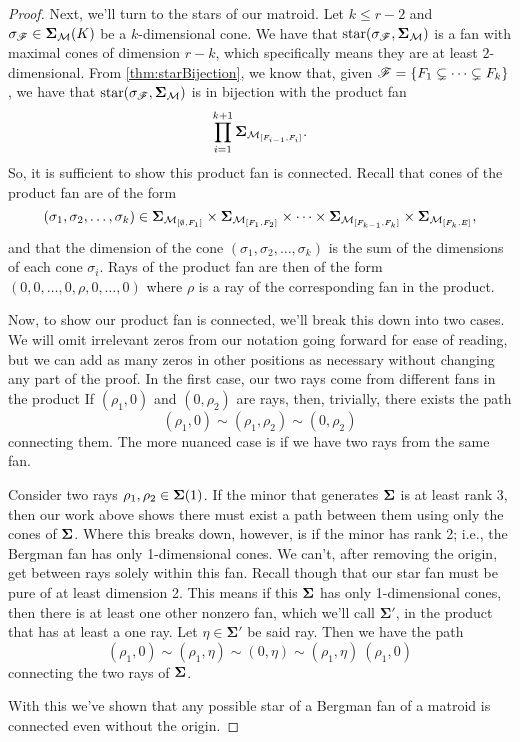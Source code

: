 \documentclass[12pt,oneside]{../../sfsuthesis}
\begin{document}
\begin{proof}
    Next, we'll turn to the stars of our matroid.
    Let \( k \leq r - 2 \) and \( \sigma_{\mathscr{F}} \in \bm{\Sigma}_{\mathcal{M}}(K) \) be a \( k \)-dimensional cone.
    We have that \( \operatorname{star}( \sigma_{\mathscr{F}}, \bm{\Sigma}_{\mathcal{M}}) \) is a fan with maximal cones of dimension \( r - k \), which specifically means they are at least \( 2 \)-dimensional.
    From \th\ref{thm:starBijection}, we know that, given \( \mathscr{F} = \{ F_1 \subsetneq \cdots \subsetneq F_k \} \), we have that \( \operatorname{star}( \sigma_{\mathscr{F}}, \bm{\Sigma}_{\mathcal{M}}) \) is in bijection with the product fan
    \[
        \prod_{i = 1}^{k+1} \bm{\Sigma}_{\mathcal{M}_{[F_{i-1}, F_i]}}.
    \]
    So, it is sufficient to show this product fan is connected.
    Recall that cones of the product fan are of the form
    \[
        (\sigma_1, \sigma_2, \dots, \sigma_k) \in \bm{\Sigma}_{\mathcal{M}_{[\emptyset, F_1]}} \times \bm{\Sigma}_{\mathcal{M}_{[F_{1}, F_2]}} \times \cdots \times \bm{\Sigma}_{\mathcal{M}_{[F_{k-1}, F_k]}} \times \bm{\Sigma}_{\mathcal{M}_{[F_{k}, E]}},
    \]
    and that the dimension of the cone \( (\sigma_1, \sigma_2, \dots, \sigma_k) \) is the sum of the dimensions of each cone \( \sigma_i \).
    Rays of the product fan are then of the form \( (0, 0, \dots, 0,  \rho, 0, \dots, 0) \) where \( \rho \) is a ray of the corresponding fan in the product.

    Now, to show our product fan is connected, we'll break this down into two cases.
    We will omit irrelevant zeros from our notation going forward for ease of reading, but we can add as many zeros in other positions as necessary without changing any part of the proof.
    In the first case, our two rays come from different fans in the product
    If \( (\rho_1, 0) \) and \( (0, \rho_2) \) are rays, then, trivially, there exists the path
    \[
        (\rho_1, 0) \sim (\rho_1, \rho_2) \sim (0, \rho_2)
    \]
    connecting them.
    The more nuanced case is if we have two rays from the same fan.

    Consider two rays \( \rho_1, \rho_2 \in \bm{\Sigma}(1)\).
    If the minor that generates \( \bm{\Sigma} \) is at least rank 3, then our work above shows there must exist a path between them using only the cones of \( \bm{\Sigma} \).
    Where this breaks down, however, is if the minor has rank 2; i.e., the Bergman fan has only 1-dimensional cones.
    We can't, after removing the origin, get between rays solely within this fan.
    Recall though that our star fan must be pure of at least dimension 2.
    This means if this \(\bm{\Sigma} \) has only 1-dimensional cones, then there is at least one other nonzero fan, which we'll call \( \bm{\Sigma'} \), in the product that has at least a one ray.
    Let \( \eta \in  \bm{\Sigma'} \) be said ray.
    Then we have the path
    \[
        (\rho_1, 0) \sim (\rho_1, \eta) \sim (0, \eta) \sim (\rho_1, \eta) ~ (\rho_1, 0)
    \]
    connecting the two rays of \( \bm{\Sigma} \).

    With this we've shown that any possible star of a Bergman fan of a matroid is connected even without the origin.
\end{proof}
\end{document}
